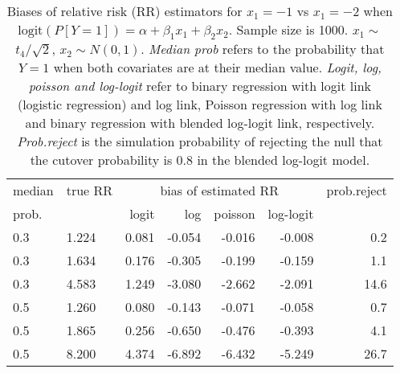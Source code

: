 \documentclass[12pt,a4paper]{article}
\begin{document}
\begin{table}[H] 
\small\sf\centering 
\caption{Biases of relative risk (RR) estimators for $x_1=-1$ vs $x_1=-2$ when $\mbox{logit}(P[Y=1])=\alpha+\beta_1 x_1 + \beta_2 x_2$. Sample size is 1000. $x_1 \sim $$t_4/\sqrt{2}$, $x_2 \sim N(0,1)$. {\it Median prob} refers to the probability that $Y=1$ when both covariates are at their median value. {\it Logit, log, poisson and log-logit} refer to binary regression with logit link (logistic regression) and log link, Poisson regression with log link and binary regression with blended log-logit link, respectively. {\it Prob.reject} is the simulation probability of rejecting the null that the cutover probability is $0.8$ in the blended log-logit model.} 
\begin{tabular}{llrrrrr} 
\toprule 
median & true RR & \multicolumn{4}{c}{bias of estimated RR} & prob.reject \\ 
prob. & & logit & log & poisson & log-logit  & \\ \midrule 
0.3 & 1.224 & 0.081 & -0.054 & -0.016 & -0.008 &  0.2 \\  
0.3 & 1.634 & 0.176 & -0.305 & -0.199 & -0.159 &  1.1 \\  
0.3 & 4.583 & 1.249 & -3.080 & -2.662 & -2.091 & 14.6 \\  
0.5 & 1.260 & 0.080 & -0.143 & -0.071 & -0.058 &  0.7 \\  
0.5 & 1.865 & 0.256 & -0.650 & -0.476 & -0.393 &  4.1 \\  
0.5 & 8.200 & 4.374 & -6.892 & -6.432 & -5.249 & 26.7 \\  
\bottomrule 
\end{tabular} 
\end{table} 
\end{document}
